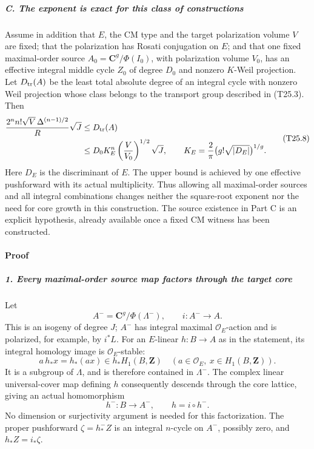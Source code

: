 \documentclass[11pt,a4paper]{article}
\theoremstyle{definition}
\begin{document}
\subparagraph{C. The exponent is exact for this class of constructions}\label{c.-the-exponent-is-exact-for-this-class-of-constructions}

Assume in addition that \(E\), the CM type and the target polarization volume \(V\) are fixed; that the polarization has Rosati conjugation on \(E\); and that one fixed maximal-order source \(A_0=\mathbf C^g/\Phi(I_0)\), with polarization volume \(V_0\), has an effective integral middle cycle \(Z_0\) of degree \(D_0\) and nonzero \(K\)-Weil projection. Let \(D_{\rm tr}(A)\) be the least total absolute degree of an integral cycle with nonzero Weil projection whose class belongs to the transport group described in (T25.3). Then \[
 \begin{aligned}
 \frac{2^n n!\sqrt V\,\Delta^{(n-1)/2}}{R}\sqrt J
 &\le D_{\rm tr}(A)\\
 &\le D_0 K_E^n\left(\frac V{V_0}\right)^{1/2}\sqrt J,
 \qquad
 K_E=\frac2\pi\bigl(g!\sqrt{|D_E|}\bigr)^{1/g}.
 \end{aligned}
 \tag{T25.8}
\] Here \(D_E\) is the discriminant of \(E\). The upper bound is achieved by one effective pushforward with its actual multiplicity. Thus allowing all maximal-order sources and all integral combinations changes neither the square-root exponent nor the need for core growth in this construction. The source existence in Part C is an explicit hypothesis, already available once a fixed CM witness has been constructed.

\paragraph{Proof}\label{proof-6}

\subparagraph{1. Every maximal-order source map factors through the target core}\label{every-maximal-order-source-map-factors-through-the-target-core}

Let \[
 A^-=\mathbf C^g/\Phi(\Lambda^-),\qquad
 i:A^-\longrightarrow A.
 \tag{T25.9}
\] This is an isogeny of degree \(J\); \(A^-\) has integral maximal \(\mathcal O_E\)-action and is polarized, for example, by \(i^*L\). For an \(E\)-linear \(h:B\to A\) as in the statement, its integral homology image is \(\mathcal O_E\)-stable: \[
 a\,h_*x=h_*(a x)\in h_*H_1(B,\mathbf Z)
 \quad(a\in\mathcal O_E,\ x\in H_1(B,\mathbf Z)).
 \tag{T25.10}
\] It is a subgroup of \(\Lambda\), and is therefore contained in \(\Lambda^-\). The complex linear universal-cover map defining \(h\) consequently descends through the core lattice, giving an actual homomorphism \[
 h^-:B\longrightarrow A^-,\qquad h=i\circ h^-.
 \tag{T25.11}
\] No dimension or surjectivity argument is needed for this factorization. The proper pushforward \(\zeta=h^-_*Z\) is an integral \(n\)-cycle on \(A^-\), possibly zero, and \(h_*Z=i_*\zeta\).
\end{document}
